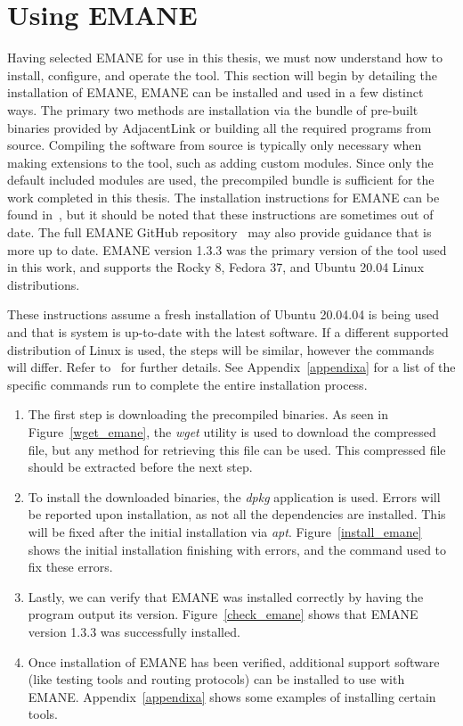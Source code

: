 \section{Using EMANE}
Having selected EMANE for use in this thesis, we must now understand how to install, configure, and operate the tool.
This section will begin by detailing the installation of EMANE, 
EMANE can be installed and used in a few distinct ways.
The primary two methods are installation via the bundle of pre-built binaries provided by AdjacentLink or building all the required programs from source.
Compiling the software from source is typically only necessary when making extensions to the tool, such as adding custom modules.
Since only the default included modules are used, the precompiled bundle is sufficient for the work completed in this thesis.
The installation instructions for EMANE can be found in~\cite{emane_tutorial}, but it should be noted that these instructions are sometimes out of date.
The full EMANE GitHub repository~\cite{emane_git} may also provide guidance that is more up to date.
EMANE version 1.3.3 was the primary version of the tool used in this work, and supports the Rocky 8, Fedora 37, and Ubuntu 20.04 Linux distributions.\par
These instructions assume a fresh installation of Ubuntu 20.04.04 is being used and that is system is up-to-date with the latest software.
If a different supported distribution of Linux is used, the steps will be similar, however the commands will differ. Refer to~\cite{emane_tutorial,emane_git} for further details.
See Appendix~\ref{appendixa} for a list of the specific commands run to complete the entire installation process.
\begin{enumerate}
    \item The first step is downloading the precompiled binaries. As seen in Figure~\ref{wget_emane}, the \textit{wget} utility is used to download the compressed file, but any method for retrieving this file can be used. This compressed file should be extracted before the next step.
    \item To install the downloaded binaries, the \textit{dpkg} application is used. Errors will be reported upon installation, as not all the dependencies are installed. This will be fixed after the initial installation via \textit{apt}. Figure~\ref{install_emane} shows the initial installation finishing with errors, and the command used to fix these errors.
    \item Lastly, we can verify that EMANE was installed correctly by having the program output its version. Figure~\ref{check_emane} shows that EMANE version 1.3.3 was successfully installed.
    \item Once installation of EMANE has been verified, additional support software (like testing tools and routing protocols) can be installed to use with EMANE. Appendix~\ref{appendixa} shows some examples of installing certain tools.
\end{enumerate}

